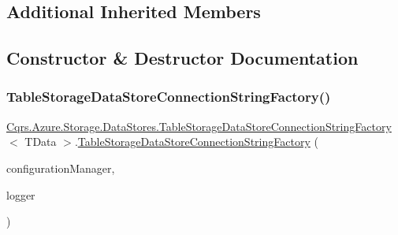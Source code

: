 \subsection*{Additional Inherited Members}


\subsection{Constructor \& Destructor Documentation}
\mbox{\label{classCqrs_1_1Azure_1_1Storage_1_1DataStores_1_1TableStorageDataStoreConnectionStringFactory_a72218c0219be3c3185ae98893f0d91e3_a72218c0219be3c3185ae98893f0d91e3}} 
\subsubsection{\texorpdfstring{Table\+Storage\+Data\+Store\+Connection\+String\+Factory()}{TableStorageDataStoreConnectionStringFactory()}}
{\footnotesize\ttfamily \hyperlink{classCqrs_1_1Azure_1_1Storage_1_1DataStores_1_1TableStorageDataStoreConnectionStringFactory}{Cqrs.\+Azure.\+Storage.\+Data\+Stores.\+Table\+Storage\+Data\+Store\+Connection\+String\+Factory}$<$ T\+Data $>$.\hyperlink{classCqrs_1_1Azure_1_1Storage_1_1DataStores_1_1TableStorageDataStoreConnectionStringFactory}{Table\+Storage\+Data\+Store\+Connection\+String\+Factory} (\begin{DoxyParamCaption}\item[{\hyperlink{interfaceCqrs_1_1Configuration_1_1IConfigurationManager}{I\+Configuration\+Manager}}]{configuration\+Manager,  }\item[{I\+Logger}]{logger }\end{DoxyParamCaption})}



